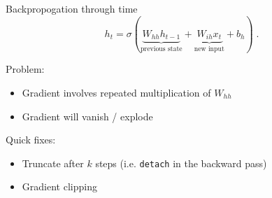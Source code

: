 \documentclass[usenames,dvipsnames,notes,11pt,aspectratio=169]{beamer}
\begin{document}
\begin{frame}
    {Backpropogation through time}
    $$
 h_t = \sigma(\underbrace{W_{hh}h_{t-1}}_{\text{previous state}}+
 \underbrace{W_{ih}x_t}_{\text{new input}} + b_h)
 \;.
    $$

    \gray{[board]}

    Problem:\\
    \begin{itemize}
        \item Gradient involves repeated multiplication of $W_{hh}$
        \item Gradient will vanish / explode
    \end{itemize}

    Quick fixes:\\
    \begin{itemize}
        \item Truncate after $k$ steps (i.e. \texttt{detach} in the backward pass)
        \item Gradient clipping
    \end{itemize}
\end{frame}
\end{document}
